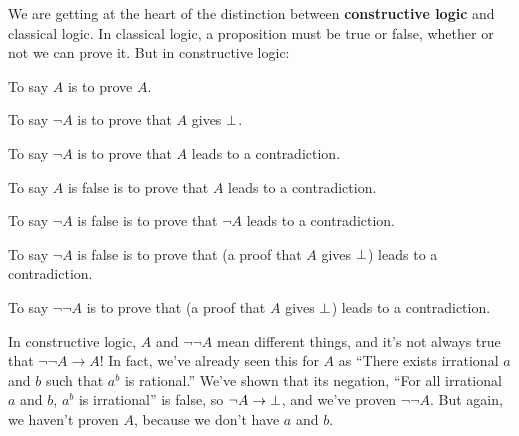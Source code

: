 \documentclass[11pt,paper=letter]{scrartcl}
\renewcommand{\lnot}{\neg}
\begin{document}
We are getting at the heart of the distinction between \textbf{constructive logic} and classical logic. In classical logic, a proposition must be true or false, whether or not we can prove it. But in constructive logic:
\begin{itemthin}
\item To say $A$ is to prove $A$.
\item To say $\lnot A$ is to prove that $A$ gives $\bot$.
\item To say $\lnot A$ is to prove that $A$ leads to a contradiction.
\item To say $A$ is false is to prove that $A$ leads to a contradiction.
\item To say $\lnot A$ is false is to prove that $\lnot A$ leads to a contradiction.
\item To say $\lnot A$ is false is to prove that (a proof that $A$ gives $\bot$) leads to a contradiction.
\item To say $\lnot \lnot A$ is to prove that (a proof that $A$ gives $\bot$) leads to a contradiction.
\end{itemthin}
In constructive logic, $A$ and $\lnot\lnot A$ mean different things, and it's not always true that $\lnot\lnot A \to A$! In fact, we've already seen this for $A$ as ``There exists irrational $a$ and $b$ such that $a^b$ is rational.'' We've shown that its negation, ``For all irrational $a$ and $b$, $a^b$ is irrational'' is false, so $\lnot A \to \false$, and we've proven $\lnot\lnot A$. But again, we haven't proven $A$, because we don't have $a$ and $b$.
\end{document}
